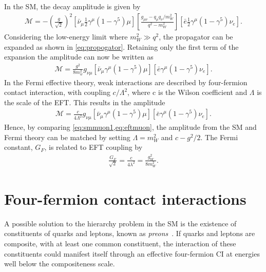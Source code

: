 In the SM, the decay amplitude is given by
\begin{equation}
    \label{eq:smmuon}
    \begin{aligned}
        \mathcal{M} =  - \left( \frac{g}{\sqrt{2}} \right)^2
        [\bar{\nu}_\mu\frac{1}{2}\gamma^\mu(1-\gamma^5)\mu]
        \left[ \frac{g_{\mu\nu} - q_\mu q_\nu/ m_W^2}{q^2 - m_W^2}  \right]
        [\bar{e}\frac{1}{2}\gamma^\mu(1-\gamma^5)\nu_e].
     \end{aligned}
\end{equation}
Considering the low-energy limit where $m_W^2 \gg q^2$, the propagator can be expanded as shown in \cref{eq:propogator}. Retaining only the first term of the expansion the amplitude can now be written as
\begin{equation}
    \label{eq:smmuon1}
    \begin{aligned}
        \mathcal{M} =  \frac{g^2}{8 m_w^2}g_{\nu\mu}
        [\bar{\nu}_\mu\gamma^\mu(1-\gamma^5)\mu]
        [\bar{e}\gamma^\mu(1-\gamma^5)\nu_e].
     \end{aligned}
\end{equation}
In the Fermi effective theory, weak interactions are described by four-fermion contact interaction, with coupling $c/\Lambda^2$, where c is the Wilson coefficient and $\Lambda$ is the scale of the EFT. This results in the amplitude
\begin{equation}
    \label{eq:eftmuon}
    \begin{aligned}
        \mathcal{M} =  \frac{c}{4\Lambda^2}g_{\nu\mu}
        [\bar{\nu}_\mu\gamma^\mu(1-\gamma^5)\mu]
        [\bar{e}\gamma^\mu(1-\gamma^5)\nu_e].
     \end{aligned}
\end{equation}
Hence, by comparing \cref{eq:smmuon1,eq:eftmuon}, the amplitude from the SM and Fermi theory can be matched by setting $\Lambda = m_W^2$ and $ c - g^2/2$. The Fermi constant, $G_F$, is related to EFT coupling by 
\begin{equation}
    \label{eq:fermiconstant}
    \begin{aligned}
        \frac{G_F}{\sqrt{2}} = \frac{c}{4\lambda^2} = \frac{g_W^2}{8m_W^2}. 
     \end{aligned}
\end{equation}

\section{Four-fermion contact interactions}\label{sec:bsm:ci}
A possible solution to the hierarchy problem in the SM is the existence of constituents of quarks and leptons, known as \emph{preons}~\cite{Eichten:1984eu,Eichten:1983hw}. If quarks and leptons are composite, with at least one common constituent, the interaction of these constituents could manifest itself through an effective four-fermion CI at energies well below the compositeness scale.

